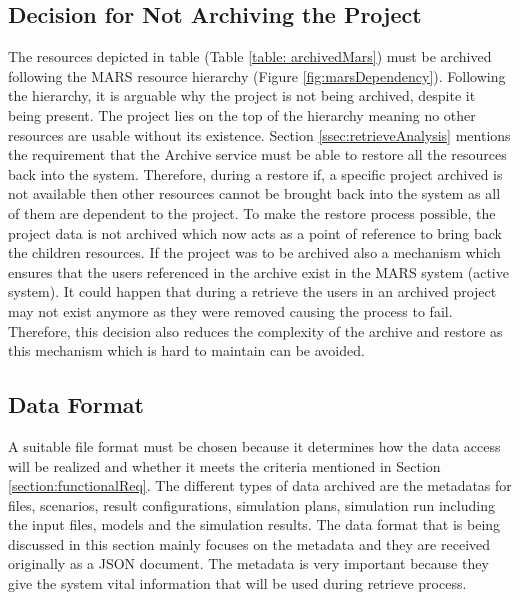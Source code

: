 \subsection{Decision for Not Archiving the Project}
The resources depicted in table (Table \ref{table: archivedMars}) must be archived following the MARS resource hierarchy (Figure \ref{fig:marsDependency}).
Following the hierarchy, it is arguable why the project is not being archived, despite it being present. The project lies on the top of the hierarchy 
meaning no other resources are usable without its existence. Section \ref{ssec:retrieveAnalysis} mentions the requirement that the Archive service must 
be able to restore all the resources back into the system. Therefore, during a restore if, a specific project archived
is not available then other resources cannot be brought back into the system as all of them are dependent to the project. To make the restore process possible,
the project data is not archived which now acts as a point of reference to bring back the children resources. 
If the project was to be archived also a mechanism
which ensures that the users referenced in the archive exist in the MARS system (active system). It could happen that during a retrieve the users in an
archived project may not exist anymore as they were removed causing the process to fail. Therefore, this decision also reduces the complexity of the 
archive and restore as this mechanism which is hard to maintain can be avoided.


\subsection{Data Format}
A suitable file format must be chosen because it determines how the data access will be realized and whether it meets
the criteria mentioned in Section \ref{section:functionalReq}. The different types of data archived are the metadatas for files, scenarios, 
result configurations, simulation plans, simulation run including the input files, models and the simulation results. 
The data format that is being discussed in this section mainly focuses on the metadata and they are received originally as a JSON document.
The metadata is very important because they give the system vital information that will be used during retrieve process. 

